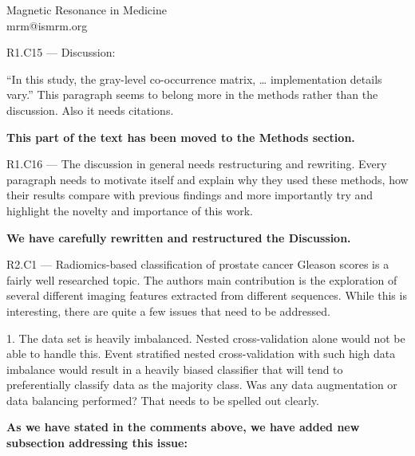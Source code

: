 \documentclass{letter}
\newenvironment{comment}[1]%
  {\vspace{5ex}\par\textsf{#1 ---} \ignorespaces}%
  {\par\ignorespacesafterend}
\newenvironment{reply}%
  {\vspace{2ex}\par\bfseries}%
  {\par\upshape}
\begin{document}
\begin{letter}{Magnetic Resonance in Medicine \\ mrm@ismrm.org}
\begin{comment}{R1.C15}
Discussion:

“In this study, the gray-level co-occurrence matrix, … implementation details
vary.” This paragraph seems to belong more in the methods rather than the
discussion. Also it needs citations.
\end{comment}

\begin{reply}
This part of the text has been moved to the Methods section.
\end{reply}


\begin{comment}{R1.C16}
The discussion in general needs restructuring and rewriting. Every paragraph
needs to motivate itself and explain why they used these methods, how their
results compare with previous findings and more importantly try and highlight
the novelty and importance of this work.
\end{comment}

\begin{reply}
We have carefully rewritten and restructured the Discussion.
\end{reply}


%




\begin{comment}{R2.C1}
Radiomics-based classification of prostate cancer Gleason scores is a fairly
well researched topic. The authors main contribution is the exploration of
several different imaging features extracted from different sequences. While
this is interesting, there are quite a few issues that need to be addressed.

1. The data set is heavily imbalanced. Nested cross-validation alone would not
be able to handle this. Event stratified nested cross-validation with such high
data imbalance would result in a heavily biased classifier that will tend to
preferentially classify data as the majority class. Was any data augmentation or
data balancing performed? That needs to be spelled out clearly.
\end{comment}

\begin{reply}
As we have stated in the comments above, we have added new subsection addressing
this issue:


\end{reply}
\end{letter}
\end{document}

